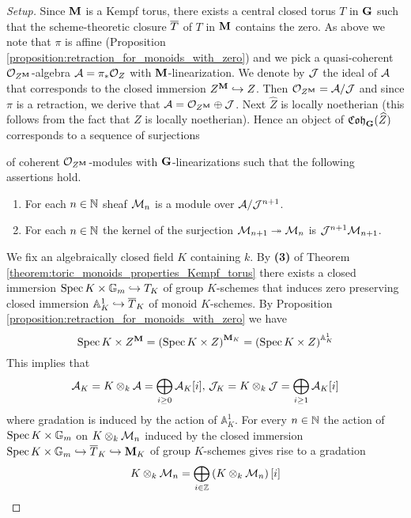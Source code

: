 \begin{proof}[Setup]
Since $\mathbf{M}$ is a Kempf torus, there exists a central closed torus $T$ in $\mathbf{G}$ such that the scheme-theoretic closure $\overline{T}$ of $T$ in $\mathbf{M}$ contains the zero. As above we note that $\pi$ is affine (Proposition \ref{proposition:retraction_for_monoids_with_zero}) and we pick a quasi-coherent ${\mathcal O}_{Z^{\mathbf{M}}}$-algebra ${\mathcal A} = \pi_*{\mathcal O}_Z$ with $\mathbf{M}$-linearization. We denote by ${\mathcal J}$ the ideal of ${\mathcal A}$ that corresponds to the closed immersion $Z^{\mathbf{M}}\hookrightarrow Z$. Then ${\mathcal O}_{Z^{\mathbf{M}}} = {\mathcal A}/{\mathcal J}$ and since $\pi$ is a retraction, we derive that ${\mathcal A} = {\mathcal O}_{Z^{\mathbf{M}}}\oplus {\mathcal J}$. Next $\widehat{Z}$ is locally noetherian (this follows from the fact that $Z$ is locally noetherian). Hence an object of $\mathfrak{Coh}_{\mathbf{G}}(\widehat{Z})$ corresponds to a sequence of surjections
\begin{center}
\end{center}
of coherent ${\mathcal O}_{Z^{\mathbf{M}}}$-modules with $\mathbf{G}$-linearizations such that the following assertions hold.
\begin{enumerate}[label=\textbf{(\arabic*)}, leftmargin=3.0em]
\item For each $n\in {\mathbb N}$ sheaf ${\mathcal M}_n$ is a module over ${\mathcal A}/{\mathcal J}^{n+1}$.
\item For each $n\in {\mathbb N}$ the kernel of the surjection ${\mathcal M}_{n+1}\twoheadrightarrow {\mathcal M}_n$ is ${\mathcal J}^{n+1}{\mathcal M}_{n+1}$.
\end{enumerate}
We fix an algebraically closed field $K$ containing $k$. By \textbf{(3)} of Theorem \ref{theorem:toric_monoids_properties_Kempf_torus} there exists a closed immersion $\mathrm{Spec}\, K\times \mathbb{G}_m\hookrightarrow T_K$ of group $K$-schemes that induces zero preserving closed immersion $\mathbb{A}^1_K\hookrightarrow \overline{T}_K$ of monoid $K$-schemes. By Proposition \ref{proposition:retraction_for_monoids_with_zero} we have
$$\mathrm{Spec}\, K\times Z^{\mathbf{M}} = \left(\mathrm{Spec}\, K\times Z\right)^{\mathbf{M}_K} = \left(\mathrm{Spec}\, K\times Z\right)^{\mathbb{A}^1_K}$$
This implies that
$${\mathcal A}_K = K\otimes_k{\mathcal A} = \bigoplus_{i\geq 0}{\mathcal A}_K[i],\,{\mathcal J}_K = K\otimes_k{\mathcal J} = \bigoplus_{i\geq 1}{\mathcal A}_K[i]$$
where gradation is induced by the action of $\mathbb{A}^1_K$. For every $n\in {\mathbb N}$ the action of $\mathrm{Spec}\, K\times \mathbb{G}_m$ on $K\otimes_k{\mathcal M}_n$ induced by the closed immersion $\mathrm{Spec}\, K\times \mathbb{G}_m \hookrightarrow \overline{T}_K\hookrightarrow \mathbf{M}_K$ of group $K$-schemes gives rise to a gradation
$$K\otimes_k{\mathcal M}_n = \bigoplus_{i\in {\mathbb Z}}\left(K\otimes_k{\mathcal M}_n\right)[i]$$
\end{proof}

